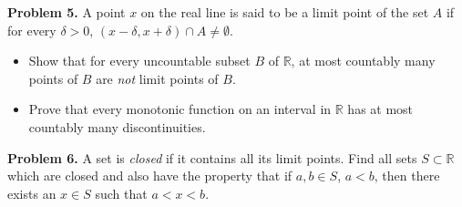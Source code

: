\documentclass[10pt,a4paper,notitlepage]{article}
\begin{document}
\textbf{Problem 5.}
A point $x$ on the real line is said to be a limit point of the set $A$ if for every $\delta >0$, $(x- \delta, x+\delta) \cap A \neq \emptyset$. 
\begin{itemize}

\item Show that for every uncountable subset $B$ of $\mathbb{R}$, at most countably many points of $B$ are \emph{not} limit points of $B$.

\item Prove that every monotonic function on an interval in $\mathbb{R}$ has at most countably many discontinuities.

\end{itemize}
\textbf{Problem 6.}
A set is \emph{closed} if it contains all its limit points. Find all sets $S \subset \mathbb{R}$ which are closed and also have the property that if $a,b \in S$, $a < b$, then there exists an $x \in S$ such that $a < x < b$.
\end{document}
